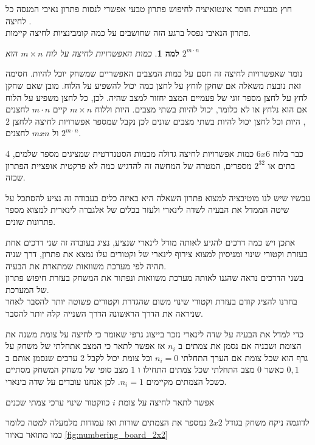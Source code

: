 \documentclass[12pt,twoside]{article}
\newtheorem{lemma}{למה}[section]
\begin{document}
חוץ מבעיית חוסר אינטואיציה לחיפוש פתרון  טבעי אפשרי לנסות
פתרון נאיבי המנסה כל לחיצה .
\\
פתרון הנאיבי נפסל ברגע הזה שחושבים על כמה קומבינציות לחיצה קיימות.

\begin{lemma}
    כמות האפשרויות לחיצה על לוח
    $m \times n$
    הוא 
    $2^{m \cdot n}$
\end{lemma}
נומר שאפשרויות לחיצה זה חסם על כמות המצבים האפשריים שמשחק יוכל להיות.
חסימה זאת נובעת משאלה אם שחקן לוחץ על לחצן כמה יכול להשפיע על הלוח.
מובן שאם שחקן לחץ על לחצן מספר זוגי של פעמיים המצב יחזור למצב שהיה.
לכן,
כל לחצן משפיע על הלוח אם הוא נלחץ או לא כלומר, יכול להיות בשתי מצבים.
היות וללוח
$m \times n$
קיים 
$m \cdot n$
לחצנים
,
היות וכל לחצן 
יכול להיות בשתי מצבים שונים
לכן נקבל 
שמספר אפשרויות לחיצה 
ללחצן 
$2$
ול
$m x n$
לחצנים
$2^{m \cdot n}$.

כבר בלוח 
$6x6$
כמות  אפשרויות לחיצה גדולה 
מכמות הסטנדרטית שמציגים מספר שלמים,
4 בתים או 
$2^32$
מספרים,
המטרה של המחשה זה להדגיש כמה לא פרקטית אופציית הפתרון שכזה.

עכשיו שיש לנו מוטיבציה למצוא פתרון השאלה היא באיזה כלים בעבודה זה נציע להסתכל על שיטה
הממדל את הבעיה לשדה לינארי ולעזר בכלים של אלגברה לינארית למצוא מספר פתרונות שונים.


אתכן ויש כמה דרכים להגיע לאותה מודל לינארי שנציע, נציג בעובדה זה שני דרכים אחת 
בעזרת וקטורי שינוי ומניסיון למצוא צירוף לינארי של וקטורים עלו נמצא את פתרון, דרך שניה תהיה
לפי מערכת משוואות שמתארת את הבעיה.
\\
בשני הדרכים נראה שהגנו לאותה מערכת משוואות ונפתור את המשחק בעזרת חיפוש פתרון של המערכת.
\\
בחרנו להציג קודם בעזרת וקטורי שינוי משום שהגדרת וקטורים פשוטה יותר להסבר לאחר שניראה את הדרך הראשונה
הדרך השנייה קלה יותר להסבר.


כדי למדל את הבעיה על שדה לינארי נזכר בייצוג גרפי שאומר כי לחיצה על צומת משנה את הצומת ושכניה 
אם נסמן את צמתים ב
$n_i$
אז אפשר לתאר כי המצב אתחלתי של משחק על גרף הוא שכל צומת אם הערך התחלתי
$n_i = 0$
וכל צומת יכול לקבל 2 ערכים שנסמן אותם ב
${0,1}$
כאשר 
$0$
מצב התחלתי שכל צמתים התחילו 
ו
$1$
מצב סופי של משחק 
המשחק מסתיים כשכל הצמתים מקיימים
$n_i = 1$.
לכן אנחנו עובדים על שדה בינארי.

אפשר לתאר לחיצה על צומת 
$i$
כווקטור שינוי ערכי צמתי שכנים

לדוגמה ניקח 
משחק בגודל
$2x2$
נמספר את הצמתים 
שורות ואז עמודות מלמעלה למטה כלומר כמו מתואר באיור
\ref{fig:numbering_board_2x2}
\end{document}

